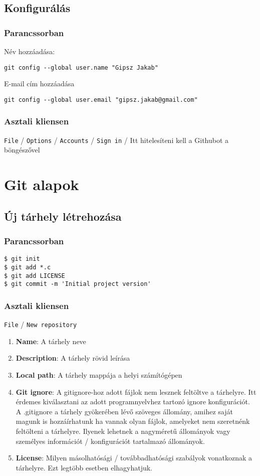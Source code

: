 \documentclass{article}
\begin{document}
\subsection*{Konfigurálás}
\subsubsection*{Parancssorban}

Név hozzáadása:
\begin{lstlisting}
git config --global user.name "Gipsz Jakab"
\end{lstlisting}

E-mail cím hozzáadása
\begin{lstlisting}
git config --global user.email "gipsz.jakab@gmail.com"
\end{lstlisting}

\subsubsection*{Asztali kliensen}

\texttt{File} / \texttt{Options} / \texttt{Accounts} / \texttt{Sign in} / Itt hitelesíteni kell a Githubot a böngészővel

\section{Git alapok}
\subsection*{Új tárhely létrehozása}
\subsubsection*{Parancssorban}
\begin{lstlisting}
$ git init
$ git add *.c
$ git add LICENSE
$ git commit -m 'Initial project version'
\end{lstlisting}

\subsubsection*{Asztali kliensen}
\texttt{File} / \texttt{New repository}
\begin{enumerate}
\item \textbf{Name}: A tárhely neve
\item \textbf{Description}: A tárhely rövid leírása
\item \textbf{Local path}: A tárhely mappája a helyi számítógépen
\item \textbf{Git ignore}: A gitignore-hoz adott fájlok nem lesznek feltöltve a tárhelyre. Itt érdemes kiválasztani az adott programnyelvhez tartozó ignore konfigurációt. A .gitignore a tárhely gyökerében lévő szöveges állomány, amihez saját magunk is hozzáírhatunk ha vannak olyan fájlok, amelyeket nem szeretnénk feltölteni a tárhelyre. Ilyenek lehetnek a nagyméretű állományok vagy személyes információt / konfigurációt tartalmazó állományok.
\item \textbf{License}: Milyen másolhatósági / továbbadhatósági szabályok vonatkoznak a tárhelyre. Ezt legtöbb esetben elhagyhatjuk.
\end{enumerate}
\end{document}

